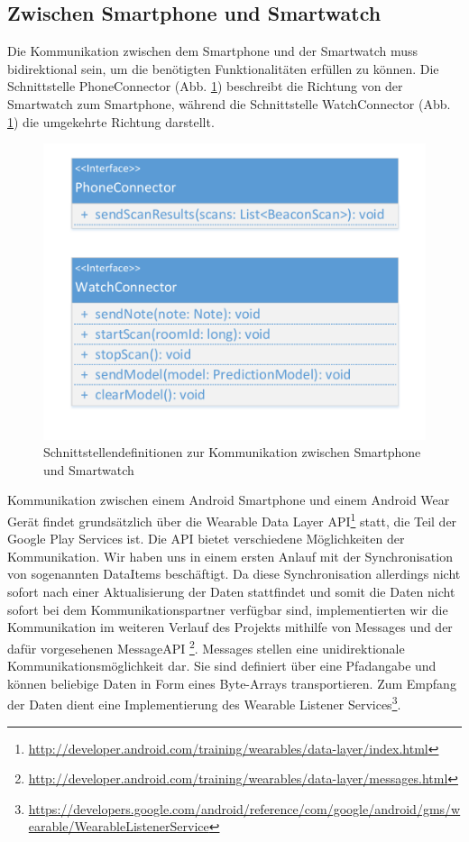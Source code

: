 \subsection{Zwischen Smartphone und Smartwatch}
Die Kommunikation zwischen dem Smartphone und der Smartwatch muss bidirektional sein, um die benötigten Funktionalitäten erfüllen zu können. Die Schnittstelle PhoneConnector (Abb. \ref{fig:Klassendiagramme}) beschreibt die Richtung von der Smartwatch zum Smartphone, während die Schnittstelle WatchConnector (Abb. \ref{fig:Klassendiagramme}) die umgekehrte Richtung darstellt.

\begin{figure}[H]
\centering
\includegraphics[width=0.5\linewidth]{../Bilder/Klassendiagramme}
\caption{Schnittstellendefinitionen zur Kommunikation zwischen Smartphone und Smartwatch}
\label{fig:Klassendiagramme}
\end{figure}


Kommunikation zwischen einem Android Smartphone und einem Android Wear Gerät findet grundsätzlich über die Wearable Data Layer API\footnote{\url{http://developer.android.com/training/wearables/data-layer/index.html}} statt, die Teil der Google Play Services ist. Die API bietet verschiedene Möglichkeiten der Kommunikation. Wir haben uns in einem ersten Anlauf mit der Synchronisation von sogenannten DataItems beschäftigt. Da diese Synchronisation allerdings nicht sofort nach einer Aktualisierung der Daten stattfindet und somit die Daten nicht sofort bei dem Kommunikationspartner verfügbar sind, implementierten wir die Kommunikation im weiteren Verlauf des Projekts mithilfe von Messages und der dafür vorgesehenen MessageAPI \footnote{\url{http://developer.android.com/training/wearables/data-layer/messages.html}}. Messages stellen eine unidirektionale Kommunikationsmöglichkeit dar. Sie sind definiert über eine Pfadangabe und können beliebige Daten in Form eines Byte-Arrays transportieren. Zum Empfang der Daten dient eine Implementierung des Wearable Listener Services\footnote{\url{https://developers.google.com/android/reference/com/google/android/gms/wearable/WearableListenerService}}.

